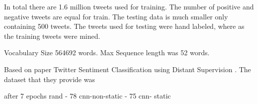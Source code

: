 \documentclass[12pt]{article}
\begin{document}
In total there are 1.6 million tweets used for training. The number of positive and negative tweets are equal for train. The testing data is much smaller only containing 500 tweets. The tweets used for testing were hand labeled, where as the training tweets were mined.

Vocabulary Size 564692 words.
Max Sequence length was 52 words.

Based on paper Twitter Sentiment Classification using Distant Supervision \cite{Go_Bhayani_Huang_2009}. The dataset that they provide was

after 7 epochs
rand - 78 %
cnn-non-static - 75 %
cnn- static

\newpage


\end{document}
